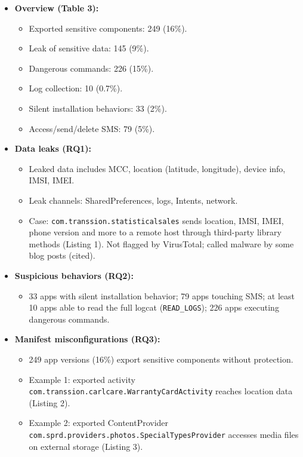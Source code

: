 \documentclass[11pt,a4paper]{article}
\begin{document}
\begin{enumerate}
    \begin{itemize}[leftmargin=*,itemsep=1pt,topsep=2pt]
        \item \textbf{Overview (Table 3):}
        \begin{itemize}[itemsep=0pt]
            \item Exported sensitive components: 249 (16\%).
            \item Leak of sensitive data: 145 (9\%).
            \item Dangerous commands: 226 (15\%).
            \item Log collection: 10 (0.7\%).
            \item Silent installation behaviors: 33 (2\%).
            \item Access/send/delete SMS: 79 (5\%).
        \end{itemize}
        \item \textbf{Data leaks (RQ1):}
        \begin{itemize}[itemsep=0pt]
            \item Leaked data includes MCC, location (latitude, longitude), device info, IMSI, IMEI.
            \item Leak channels: SharedPreferences, logs, Intents, network.
            \item Case: \texttt{com.transsion.statisticalsales} sends location, IMSI, IMEI, phone version and more to a remote host through third-party library methods (Listing 1). Not flagged by VirusTotal; called malware by some blog posts (cited).
        \end{itemize}
        \item \textbf{Suspicious behaviors (RQ2):}
        \begin{itemize}[itemsep=0pt]
            \item 33 apps with silent installation behavior; 79 apps touching SMS; at least 10 apps able to read the full logcat (\texttt{READ\_LOGS}); 226 apps executing dangerous commands.
        \end{itemize}
        \item \textbf{Manifest misconfigurations (RQ3):}
        \begin{itemize}[itemsep=0pt]
            \item 249 app versions (16\%) export sensitive components without protection.
            \item Example 1: exported activity \texttt{com.transsion.carlcare.WarrantyCardActivity} reaches location data (Listing 2).
            \item Example 2: exported ContentProvider \texttt{com.sprd.providers.photos.SpecialTypesProvider} accesses media files on external storage (Listing 3).

\end{itemize}
\end{itemize}
\end{enumerate}
\end{document}
